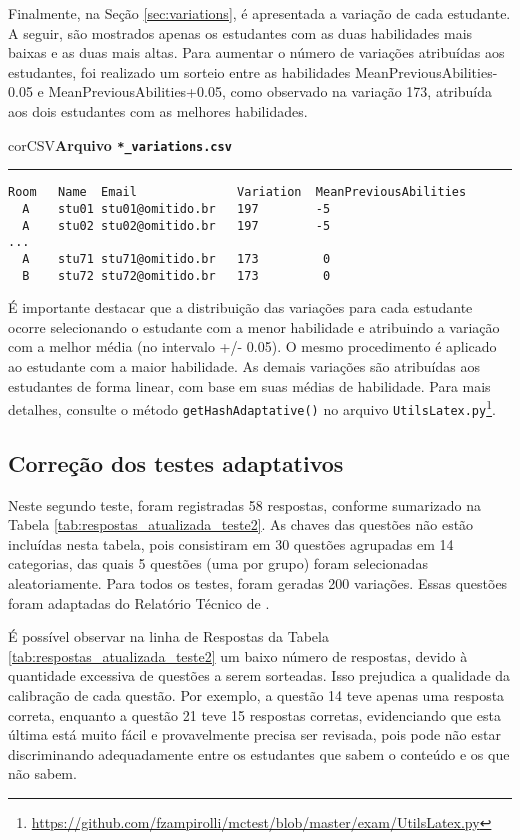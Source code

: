 Finalmente, na Seção \ref{sec:variations}, é apresentada a variação de cada estudante. A seguir, são mostrados apenas os estudantes com as duas habilidades mais baixas e as duas mais altas. Para aumentar o número de variações atribuídas aos estudantes, foi realizado um sorteio entre as habilidades MeanPreviousAbilities-0.05 e MeanPreviousAbilities+0.05, como observado na variação 173, atribuída aos dois estudantes com as melhores habilidades.

\begin{myboxCode}{corCSV}{\textbf{Arquivo \texttt{*\_variations.csv}}}\vspace{3mm}
\hrule
\begin{verbatim}
Room   Name  Email              Variation  MeanPreviousAbilities
  A    stu01 stu01@omitido.br   197        -5
  A    stu02 stu02@omitido.br   197        -5
... 
  A    stu71 stu71@omitido.br   173         0
  B    stu72 stu72@omitido.br   173         0
\end{verbatim}
\end{myboxCode}

É importante destacar que a distribuição das variações para cada estudante ocorre selecionando o estudante com a menor habilidade e atribuindo a variação com a melhor média (no intervalo +/- 0.05). O mesmo procedimento é aplicado ao estudante com a maior habilidade. As demais variações são atribuídas aos estudantes de forma linear, com base em suas médias de habilidade. Para mais detalhes, consulte o método \texttt{getHashAdaptative()} no arquivo \texttt{UtilsLatex.py}\footnote{\url{https://github.com/fzampirolli/mctest/blob/master/exam/UtilsLatex.py}}.

\subsection{Correção dos testes adaptativos}

Neste segundo teste, foram registradas 58 respostas, conforme sumarizado na Tabela \ref{tab:respostas_atualizada_teste2}. As chaves das questões não estão incluídas nesta tabela, pois consistiram em 30 questões agrupadas em 14 categorias, das quais 5 questões (uma por grupo) foram selecionadas aleatoriamente. Para todos os testes, foram geradas 200 variações. Essas questões foram adaptadas do Relatório Técnico de .

É possível observar na linha de Respostas da Tabela \ref{tab:respostas_atualizada_teste2} um baixo número de respostas, devido à quantidade excessiva de questões a serem sorteadas. Isso prejudica a qualidade da calibração de cada questão. Por exemplo, a questão 14 teve apenas uma resposta correta, enquanto a questão 21 teve 15 respostas corretas, evidenciando que esta última está muito fácil e provavelmente precisa ser revisada, pois pode não estar discriminando adequadamente entre os estudantes que sabem o conteúdo e os que não sabem.


